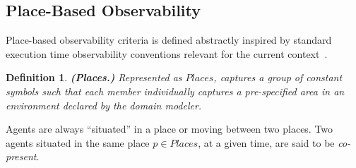 \documentclass[letterpaper]{article} %
\newtheorem{definition}{Definition}
\begin{document}
\subsection{Place-Based Observability}
Place-based observability criteria is defined abstractly inspired by standard execution time observability conventions relevant for the current context~\cite{devin2016implemented}. 

\begin{definition} \label{def:places}
\textbf{(Places.)} Represented as $\mathit{Places}$, captures a group of constant symbols such that each member individually captures a pre-specified area in an environment declared by the domain modeler.  
\end{definition}

Agents are always ``situated'' in a place or moving between two places. Two agents situated in the same place $p \in \mathit{Places}$, at a given time, are said to be \textit{co-present}.


\end{document}
